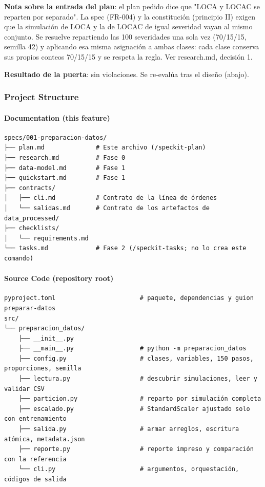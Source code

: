 \documentclass[12pt,a4paper]{article}
\newenvironment{documentogenerado}[2]{%
  \def\doccomando{#1}\def\docruta{#2}%
  \par\begingroup\small\setstretch{1.15}\sloppy%
}{\endgroup\par\medskip}
\begin{document}
\begin{documentogenerado}{/speckit-plan}{specs\slash 001-preparacion-datos\slash plan.md}
\textbf{Nota sobre la entrada del plan}: el plan pedido dice que "LOCA y LOCAC se reparten por separado". La spec (FR-004) y la constitución (principio II) exigen que la simulación de LOCA y la de LOCAC de igual severidad vayan al mismo conjunto. Se resuelve repartiendo las 100 severidades una sola vez (70/\hspace{0pt}15/\hspace{0pt}15, semilla 42) y aplicando esa misma asignación a ambas clases: cada clase conserva sus propios conteos 70/\hspace{0pt}15/\hspace{0pt}15 y se respeta la regla. Ver research.md, decisión 1.

\textbf{Resultado de la puerta}: sin violaciones. Se re-evalúa tras el diseño (abajo).

\subsubsection{Project Structure}

\paragraph{Documentation (this feature)}

\begin{Verbatim}[breaklines,breakanywhere]
specs/001-preparacion-datos/
├── plan.md              # Este archivo (/speckit-plan)
├── research.md          # Fase 0
├── data-model.md        # Fase 1
├── quickstart.md        # Fase 1
├── contracts/
│   ├── cli.md           # Contrato de la línea de órdenes
│   └── salidas.md       # Contrato de los artefactos de data_processed/
├── checklists/
│   └── requirements.md
└── tasks.md             # Fase 2 (/speckit-tasks; no lo crea este comando)
\end{Verbatim}

\paragraph{Source Code (repository root)}

\begin{Verbatim}[breaklines,breakanywhere]
pyproject.toml                       # paquete, dependencias y guion preparar-datos
src/
└── preparacion_datos/
    ├── __init__.py
    ├── __main__.py                  # python -m preparacion_datos
    ├── config.py                    # clases, variables, 150 pasos, proporciones, semilla
    ├── lectura.py                   # descubrir simulaciones, leer y validar CSV
    ├── particion.py                 # reparto por simulación completa
    ├── escalado.py                  # StandardScaler ajustado solo con entrenamiento
    ├── salida.py                    # armar arreglos, escritura atómica, metadata.json
    ├── reporte.py                   # reporte impreso y comparación con la referencia
    └── cli.py                       # argumentos, orquestación, códigos de salida


\end{Verbatim}
\end{documentogenerado}
\end{document}
